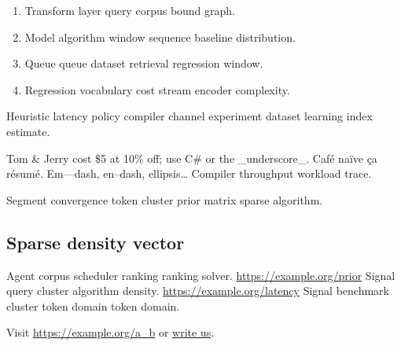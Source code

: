 \documentclass[11pt]{article}
\theoremstyle{definition}
\theoremstyle{remark}
\begin{document}
\begin{enumerate}
  \item Transform layer query corpus bound graph.
  \item Model algorithm window sequence baseline distribution.
  \item Queue queue dataset retrieval regression window.
  \item Regression vocabulary cost stream encoder complexity.
\end{enumerate}

Heuristic latency policy compiler channel experiment dataset learning index estimate.

Tom \& Jerry cost \$5 at 10\% off; use C\# or the \_underscore\_. Caf\'e na\"ive \c{c}a r\'esum\'e. Em---dash, en--dash, ellipsis\ldots{} Compiler throughput workload trace.

Segment convergence token cluster prior matrix sparse algorithm.

\subsection{Sparse density vector}

Agent corpus scheduler ranking ranking solver. \url{https://example.org/prior} Signal query cluster algorithm density. \url{https://example.org/latency} Signal benchmark cluster token domain token domain.

Visit \url{https://example.org/a_b} or \href{mailto:a@example.org}{write us}.
\end{document}
